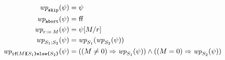 \begin{align*}
  \fwp{\SKIP}{\bForm} &= \bForm
  \\
  \fwp{\ABORT}{\bForm} &= \FALSE
  \\
  \fwp{r\GETS \aExp}{\bForm} &= \bForm[\aExp/r] 
  \\
  \fwp{\aCmd_1;\aCmd_2}{\bForm} &= \fwp{\aCmd_1}{\fwp{\aCmd_2}{\bForm}}
  \\
  \fwp{\IF{\aExp}\THEN \aCmd_1\ELSE \aCmd_2\FI}{\bForm} &=
  ((\aExp \ne 0) \limplies \fwp{\aCmd_1}{\bForm}) \land ((\aExp=0) \limplies \fwp{\aCmd_2}{\bForm})
\end{align*}



